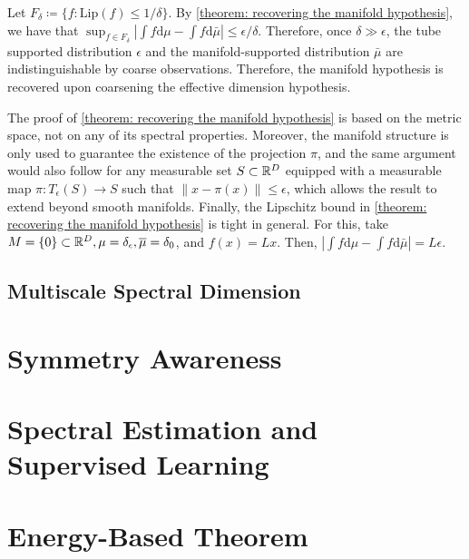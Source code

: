 \documentclass{article}
\begin{document}
\begin{corollary}
	Let $F_\delta \coloneqq \{f: \mathrm{Lip}(f) \leq 1/\delta\}$. By \cref{theorem: recovering the manifold hypothesis}, we have that $\sup_{f\in F_\delta} | \int f\mathrm d\mu - \int f \mathrm d\bar{\mu} | \leq \epsilon/\delta$. Therefore, once $\delta\gg \epsilon$, the tube supported distribution $\epsilon$ and the manifold-supported distribution $\bar{\mu}$ are indistinguishable by coarse observations. Therefore, the manifold hypothesis is recovered upon coarsening the effective dimension hypothesis.
\end{corollary}

\begin{remark}
	The proof of \cref{theorem: recovering the manifold hypothesis} is based on the metric space, not on any of its spectral properties. Moreover, the manifold structure is only used to guarantee the existence of the projection $\pi$, and the same argument would also follow for any measurable set $S\subset \mathbb{R}^D$ equipped with a measurable map $\pi: T_\epsilon(S)\to S$  such that $\|x - \pi(x)\| \leq \epsilon$, which allows the result to extend beyond smooth manifolds. Finally, the Lipschitz bound in \cref{theorem: recovering the manifold hypothesis} is tight in general. For this, take $M = \{0\} \subset \mathbb{R}^D, \mu = \delta_\epsilon, \overline{\mu} = \delta_0$, and $f(x) = Lx$. Then, $|\int f\mathrm d\mu - \int f \mathrm d\bar{\mu}| = L\epsilon$.
\end{remark}

\subsection{Multiscale Spectral Dimension}

\section{Symmetry Awareness}

\newpage

\section{Spectral Estimation and Supervised Learning}


\newpage

\section{Energy-Based Theorem}
\end{document}

